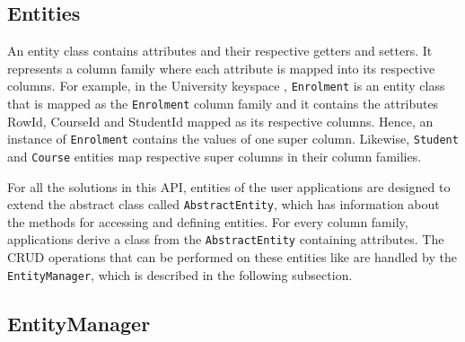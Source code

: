 	\subsection{Entities} 
	An entity class contains attributes and their respective  getters and setters.
	 It represents a column family where each attribute is mapped into its
	 respective columns.  For example,  in the University keyspace , 
	\texttt{Enrolment} is an entity class that is mapped as the
	\texttt{Enrolment} column family and it contains the attributes RowId,
	CourseId and StudentId  mapped as its respective columns. Hence, an instance of
	\texttt{Enrolment} contains the values of one super column. Likewise, 
	\texttt{Student} and \texttt{Course} entities  map respective super columns in
	their column families.
	
	For all the solutions in this \ac{API},  entities of the user applications are
	designed to extend the abstract class called \texttt{AbstractEntity},  which has
	information about the  methods for accessing and defining  entities.  For
	every column family, applications derive a class from the
	\texttt{AbstractEntity} containing attributes.
	The \ac{CRUD} operations that can be performed on these entities like   are
	handled by the \texttt{EntityManager},  which is described in the following
	subsection.
		
	\subsection{EntityManager}
% 	

